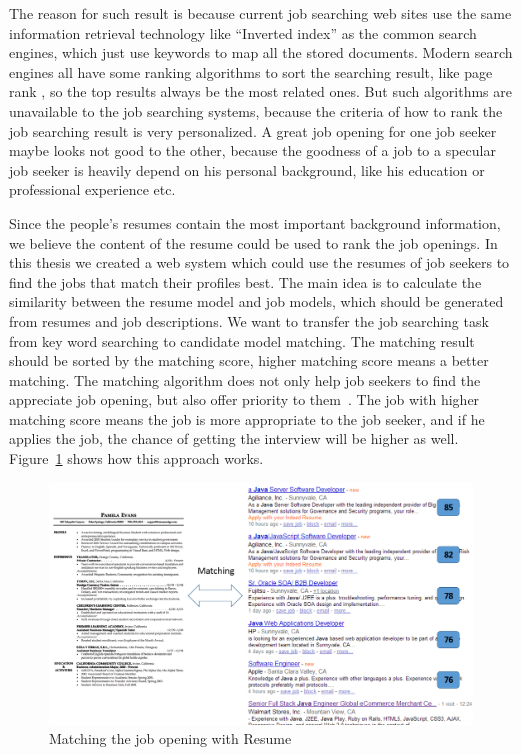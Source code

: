 The reason for such result is because current job searching web sites use the same information retrieval technology like ``Inverted index'' \cite{zobel2006inverted} as the common search engines, which just use keywords to map all the stored documents. Modern search engines all have some ranking algorithms to sort the searching result, like page rank \cite{page1999pagerank}, so the top results always be the most related ones. But such algorithms are unavailable to the job searching systems, because the criteria  of how to rank the job searching result is very personalized. A great job opening for one job seeker maybe looks not good to the other, because the goodness of a job to a specular job seeker is heavily depend on his personal background, like his education or professional experience etc.

Since the people's resumes contain the most important background information, we believe the content of the resume could be used to rank the job openings. In this thesis we created a web system which could use the resumes of job seekers to find the jobs that match their profiles best. The main idea is to calculate the similarity between the resume model and job models, which should be generated from resumes and job descriptions. We want to transfer the job searching task from key word searching to candidate model matching. The matching result should be sorted by the matching score, higher matching score means a better matching. The matching algorithm does not only help job seekers to find the appreciate job opening, but also offer priority to them~\cite{gueutal2006brave}.  The job with higher matching score means the job is more appropriate to the job seeker, and if he applies the job, the chance of getting the interview will be higher as well. Figure~\ref{fig:Matching} shows how this approach works.


\begin{figure}[htbp]
  \centering
  \includegraphics[scale=0.5]{images/matching.png}
  \caption{Matching the job opening with Resume}
  \label{fig:Matching}
\end{figure}

